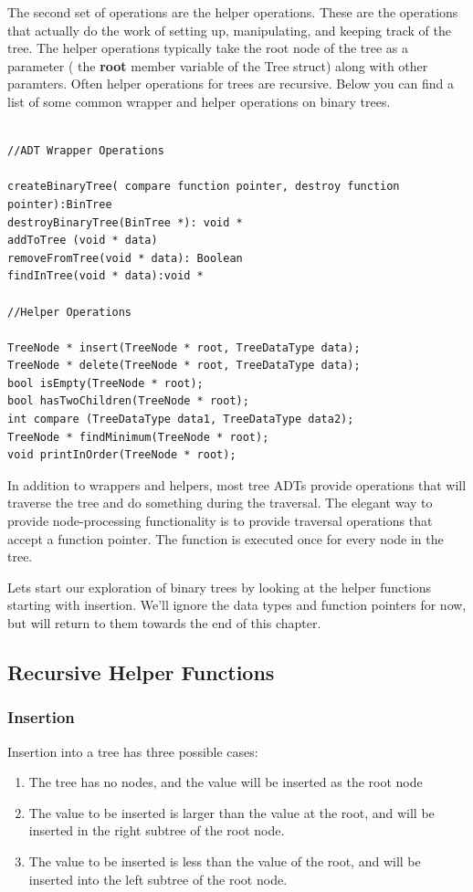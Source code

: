 The second set of operations are the helper
operations. These are the operations that actually do the work of
setting up, manipulating, and keeping track of the tree.  The helper operations typically take the root node of the tree as a parameter ( the \textbf{root} member variable of the Tree struct) along with other paramters.  Often helper operations for trees are recursive.
Below you can find a list of some common wrapper and helper operations on binary trees.

\begin{lstlisting}

//ADT Wrapper Operations

createBinaryTree( compare function pointer, destroy function pointer):BinTree
destroyBinaryTree(BinTree *): void *
addToTree (void * data)
removeFromTree(void * data): Boolean
findInTree(void * data):void *

//Helper Operations

TreeNode * insert(TreeNode * root, TreeDataType data);
TreeNode * delete(TreeNode * root, TreeDataType data);
bool isEmpty(TreeNode * root);
bool hasTwoChildren(TreeNode * root);
int compare (TreeDataType data1, TreeDataType data2);
TreeNode * findMinimum(TreeNode * root);
void printInOrder(TreeNode * root);
\end{lstlisting}

In addition to wrappers and helpers, most tree ADTs provide operations
that will traverse the tree and do something during the traversal. The
elegant way to provide node-processing functionality is to provide
traversal operations that accept a function pointer. The function is
executed once for every node in the tree.

Lets start our exploration of binary trees by looking at the helper
functions starting with insertion. We'll ignore the data types and
function pointers for now, but will return to them towards the end of
this chapter.

\subsection{Recursive Helper Functions}
\subsubsection{Insertion}

Insertion into a tree has three possible cases:

\begin{enumerate}
\item
  The tree has no nodes, and the value will be inserted as the root node
\item
  The value to be inserted is larger than the value at the root, and
  will be inserted in the right subtree of the root node.
\item
  The value to be inserted is less than the value of the root, and will
  be inserted into the left subtree of the root node.
\end{enumerate}

